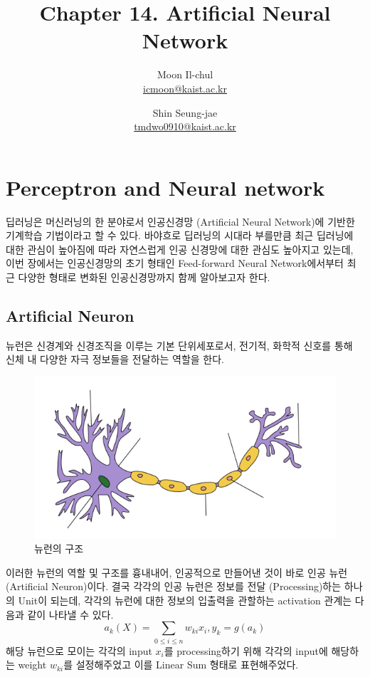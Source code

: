 \documentclass[draft=false]{oblivoir}
\author{Moon Il-chul \\ \href{mailto:icmoon@kaist.ac.kr}{icmoon@kaist.ac.kr} 
   \and Shin Seung-jae \\ \href{mailto:tmdwo0910@kaist.ac.kr}{tmdwo0910@kaist.ac.kr} }
\title{Chapter 14. Artificial Neural Network}
\begin{document}
\maketitle
\tableofcontents
\section{Perceptron and Neural network}
딥러닝은 머신러닝의 한 분야로서  인공신경망 (Artificial Neural Network)에 기반한 기계학습 기법이라고 할 수 있다. 바야흐로 딥러닝의 시대라 부를만큼 최근 딥러닝에 대한 관심이 높아짐에 따라 자연스럽게 인공 신경망에 대한 관심도 높아지고 있는데, 이번 장에서는 인공신경망의 초기 형태인 Feed-forward Neural Network에서부터 최근 다양한 형태로 변화된 인공신경망까지 함께 알아보고자 한다. 
\subsection{Artificial Neuron}
뉴런은 신경계와 신경조직을 이루는 기본 단위세포로서, 전기적, 화학적 신호를 통해 신체 내 다양한 자극 정보들을 전달하는 역할을 한다. 
\begin{figure}[ht] \centering 
\includegraphics[scale=0.5]{fig14_1.png} 
\caption{뉴런의 구조}
\label{fig:14-1}
\end{figure}
이러한 뉴런의 역할 및 구조를 흉내내어, 인공적으로 만들어낸 것이 바로 인공 뉴런 (Artificial Neuron)이다. 결국 각각의 인공 뉴런은 정보를 전달 (Processing)하는 하나의 Unit이 되는데, 각각의 뉴런에 대한 정보의 입출력을 관할하는 activation 관계는 다음과 같이 나타낼 수 있다. 
\begin{equation}
a_{k}(X) = \sum_{0 \leq i \leq n}w_{ki}x_{i}, y_{k} = g(a_{k})
\label{eq:14-2-1}
\end{equation}
해당 뉴런으로 모이는 각각의 input $x_{i}$를 processing하기 위해 각각의 input에 해당하는 weight $w_{ki}$를 설정해주었고 이를 Linear Sum 형태로 표현해주었다. 
\end{document}
